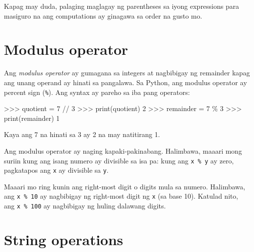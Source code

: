 \documentclass[10pt,]{book}
\newenvironment{Shaded}{}{}
\newcommand{\BuiltInTok}[1]{\textcolor[rgb]{0.00,0.50,0.00}{#1}}
\newcommand{\DecValTok}[1]{\textcolor[rgb]{0.25,0.63,0.44}{#1}}
\newcommand{\NormalTok}[1]{#1}
\newcommand{\OperatorTok}[1]{\textcolor[rgb]{0.40,0.40,0.40}{#1}}
\begin{document}
Kapag may duda, palaging maglagay ng parentheses sa iyong expressions
para masiguro na ang computations ay ginagawa sa order na gusto mo.

\section{Modulus operator}\label{modulus-operator}

 

Ang \emph{modulus operator} ay gumagana sa integers at nagbibigay ng
remainder kapag ang unang operand ay hinati sa pangalawa. Sa Python, ang
modulus operator ay percent sign (\texttt{\%}). Ang syntax ay pareho sa
iba pang operators:

\begin{Shaded}
\begin{Highlighting}[]
\OperatorTok{\textgreater{}\textgreater{}\textgreater{}}\NormalTok{ quotient }\OperatorTok{=} \DecValTok{7} \OperatorTok{//} \DecValTok{3}
\OperatorTok{\textgreater{}\textgreater{}\textgreater{}} \BuiltInTok{print}\NormalTok{(quotient)}
\DecValTok{2}
\OperatorTok{\textgreater{}\textgreater{}\textgreater{}}\NormalTok{ remainder }\OperatorTok{=} \DecValTok{7} \OperatorTok{\%} \DecValTok{3}
\OperatorTok{\textgreater{}\textgreater{}\textgreater{}} \BuiltInTok{print}\NormalTok{(remainder)}
\DecValTok{1}
\end{Highlighting}
\end{Shaded}

Kaya ang 7 na hinati sa 3 ay 2 na may natitirang 1.

Ang modulus operator ay naging kapaki-pakinabang. Halimbawa, maaari mong
suriin kung ang isang numero ay divisible sa isa pa: kung ang
\texttt{x\ \%\ y} ay zero, pagkatapos ang \texttt{x} ay divisible sa
\texttt{y}.


Maaari mo ring kunin ang right-most digit o digits mula sa numero.
Halimbawa, ang \texttt{x\ \%\ 10} ay nagbibigay ng right-most digit ng
\texttt{x} (sa base 10). Katulad nito, ang \texttt{x\ \%\ 100} ay
nagbibigay ng huling dalawang digits.

\section{String operations}\label{string-operations}

 
\end{document}
